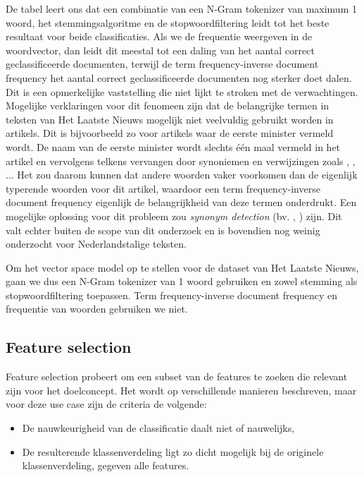 \newpage
De tabel leert ons dat een combinatie van een N-Gram tokenizer van maximum 1 woord, het stemmingsalgoritme en de stopwoordfiltering leidt tot het beste resultaat voor beide classificaties. Als we de frequentie weergeven in de woordvector, dan leidt dit meestal tot een daling van het aantal correct geclassificeerde documenten, terwijl de term frequency-inverse document frequency het aantal correct geclassificeerde documenten nog sterker doet dalen. Dit is een opmerkelijke vaststelling die niet lijkt te stroken met de verwachtingen. Mogelijke verklaringen voor dit fenomeen zijn dat de belangrijke termen in teksten van Het Laatste Nieuws mogelijk niet veelvuldig gebruikt worden in artikels. Dit is bijvoorbeeld zo voor artikels waar de eerste minister vermeld wordt. De naam van de eerste minister wordt slechts \'e\'en maal vermeld in het artikel en vervolgens telkens vervangen door synoniemen en verwijzingen zoals , , ... Het zou daarom kunnen dat andere woorden vaker voorkomen dan de eigenlijk typerende woorden voor dit artikel, waardoor een term frequency-inverse document frequency eigenlijk de belangrijkheid van deze termen onderdrukt. Een mogelijke oplossing voor dit probleem zou \textit{synonym detection} (bv. \cite{Zesch2008}, \cite{Weale2009}) zijn. Dit valt echter buiten de scope van dit onderzoek en is bovendien nog weinig onderzocht voor Nederlandstalige teksten.

Om het vector space model op te stellen voor de dataset van Het Laatste Nieuws, gaan we dus een N-Gram tokenizer van 1 woord gebruiken en zowel stemming als stopwoordfiltering toepassen. Term frequency-inverse document frequency en frequentie van woorden gebruiken we niet.

\subsection{Feature selection}\label{IG}
Feature selection probeert om een subset van de features te zoeken die relevant zijn voor het doelconcept. Het wordt op verschillende manieren beschreven, maar voor deze use case zijn de criteria de volgende:
\begin{itemize}
\item De nauwkeurigheid van de classificatie daalt niet of nauwelijks,
\item De resulterende klassenverdeling ligt zo dicht mogelijk bij de originele klassenverdeling, gegeven alle features.
\end{itemize}

